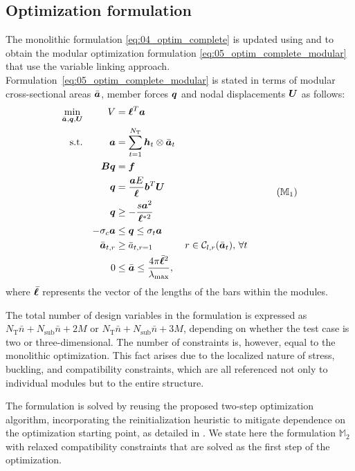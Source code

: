 \subsection{Optimization formulation}
The monolithic formulation \ref{eq:04_optim_complete} is updated using  and  to obtain the modular optimization formulation \ref{eq:05_optim_complete_modular} that use the variable linking approach. Formulation~\ref{eq:05_optim_complete_modular} is stated in terms of modular cross-sectional areas $\bar{\bm{a}}$, member forces $\bm{q}$ and nodal displacements $\bm{U}$ as follows:
\begin{equation}
    \begin{aligned}
    \min_{\bar{\vect{a}}, \vect{q}, \vect{U}}   && V &= \vect{\ell}^{T}\vect{a}\\
    \textrm{s.t.}  && \vect{a} &= \sum_{t=1}^{N_\text{T}} \vect{h}_t\otimes\bar{\vect{a}}_t \\ 
    && \matr{B}\vect{q} &= \vect{f} && \\
    && \vect{q} &= \frac{\vect{a}E}{\vect{\ell}}\vect{b}^T\vect{U} &&  \\
    && \vect{q} &\geq -\frac{s\vect{a}^2}{\vect{\ell}^{*2}} &&  \\
    && -\sigma_c\vect{a} &\leq \vect{q} \leq \sigma_t\vect{a} &&  \\
    && \bar{\vect{a}}_{t,r}&\geq \bar{a}_{t,r=1} && r \in \mathcal{C}_{l,r}(\bar{\vect{a}}_t),\, \forall t \\
    && 0 &\leq \bar{\vect{a}} \leq \frac{4 \pi \bar{\vect{\ell}}^2}{\lambda_{\text{max}}}, \\
    \end{aligned}
    \tag{${\mathbb{M}}_\text{1}$}
    \label{eq:05_optim_complete_modular}
\end{equation}
where $\bar{\bm{\ell}}$ represents the vector of the lengths of the bars within the modules.

The total number of design variables in the formulation is expressed as $N_\text{T}\bar{n} + N_{\text{sub}}\bar{n} + 2M$ or $N_\text{T}\bar{n} + N_{\text{sub}}\bar{n} + 3M$, depending on whether the test case is two or three-dimensional. The number of constraints is, however, equal to the monolithic optimization. This fact arises due to the localized nature of stress, buckling, and compatibility constraints, which are all referenced not only to individual modules but to the entire structure.

The formulation is solved by reusing the proposed two-step optimization algorithm, incorporating the reinitialization heuristic to mitigate dependence on the optimization starting point, as detailed in . We state here the formulation $\mathbb{M}_\text{2}$ with relaxed compatibility constraints that are solved as the first step of the optimization. 

